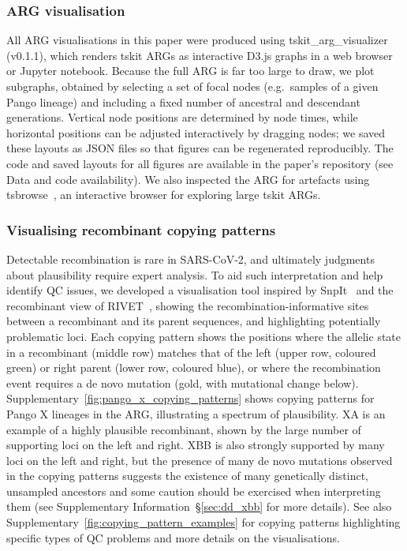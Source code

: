 \documentclass[12pt]{article}
\newcommand{\supref}[1]{Supplementary Information~\S\ref{#1}}
\newcommand{\siref}[1]{Supplementary~\ref{#1}}
\begin{document}
\subsubsection*{ARG visualisation}
All ARG visualisations in this paper were produced using
tskit\_arg\_visualizer~\cite{Kitchens2025tskit} (v0.1.1), which renders
tskit ARGs as interactive D3.js graphs in a web browser or Jupyter notebook.
Because the full ARG is far too large to draw, we plot subgraphs, obtained by
selecting a set of focal nodes (e.g.\ samples of a given Pango lineage) and
including a fixed number of ancestral and descendant generations.
Vertical node positions are determined by node times, while horizontal
positions can be adjusted interactively by dragging nodes; we saved these
layouts as JSON files so that figures can be regenerated reproducibly.
The code and saved layouts for all
figures are available in the paper's repository
(see Data and code availability).
We also inspected the ARG for artefacts
using tsbrowse~\cite{Karthikeyan2025tsbrowse}, an interactive browser
for exploring large tskit ARGs.

\subsubsection*{Visualising recombinant copying patterns}

Detectable recombination is rare in SARS-CoV-2, and
ultimately judgments about plausibility require expert analysis.
To aid such interpretation and help identify QC issues,
we developed a visualisation tool
inspired by SnpIt~\cite{OToole2024} and
the recombinant view of RIVET~\cite{Smith2023tracking},
showing the recombination-informative sites
between a recombinant and its parent sequences, and
highlighting potentially problematic loci.
Each copying pattern shows the positions
where the allelic state
in a recombinant (middle row) matches that of
the left (upper row, coloured green)
or right parent (lower row, coloured blue),
or where the recombination event requires
a de novo mutation (gold, with mutational change below).
\siref{fig:pango_x_copying_patterns}
shows copying patterns for Pango X lineages in the ARG,
illustrating a spectrum of plausibility.
XA is an example of a highly plausible recombinant,
shown by the large number of supporting loci on the left and right.
XBB is also strongly supported by many loci on the left and right,
but the presence of many de novo mutations
observed in the copying patterns suggests the existence of
many genetically distinct, unsampled ancestors
and some caution should be exercised when interpreting them
(see \supref{sec:dd_xbb} for more details).
See also \siref{fig:copying_pattern_examples} for copying patterns
highlighting specific types of QC problems
and more details on the visualisations.
\end{document}
